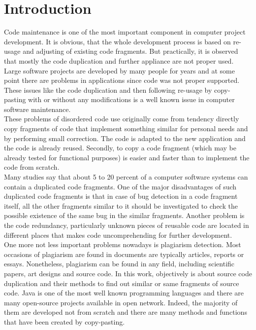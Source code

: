 \documentclass{report}
\begin{document}
\chapter{Introduction}
Code maintenance is one of the most important component in computer project development. It is obvious, that the whole development process is based on re-usage and adjusting of existing code fragments. But practically, it is observed that mostly the code duplication and further appliance are not proper used. Large software projects are developed by many people for years and at some point there are problems in applications since code was not proper supported. These issues like the code duplication and then following re-usage by copy-pasting with or without any modifications is a well known issue in computer software maintenance.
\\
These problems of disordered code use originally come from tendency directly copy fragments of code that implement something similar for personal needs and by performing small correction. The code is adapted to the new application and the code is already reused. Secondly, to copy a code fragment (which may be already tested for functional purposes) is easier and faster than to implement the code from scratch.
\\
Many studies say that about 5 to 20 percent of a computer software systems can contain a duplicated code fragments. One of the major disadvantages of such duplicated code fragments is that in case of  bug detection in a code fragment itself, all the other fragments similar to it should be investigated to check the possible existence of the same bug in the similar fragments. Another problem is the code redundancy, particularly unknown pieces of reusable code are located in different places that makes code uncomprehending for further development. 
\\
One more not less important problems nowadays is plagiarism detection. Most occasions of plagiarism are found in documents are typically articles, reports or essays. Nonetheless, plagiarism can be found in any field, including scientific papers, art designs and source code. In this work, objectively is about source code duplication and their methods to find out similar or same fragments of source code. Java is one of the most well known programming languages 
and there are many open-source projects available in open network. Indeed, the majority of them are developed not from scratch and there are many methods and functions that have been created by copy-pasting.
\\
\end{document}
